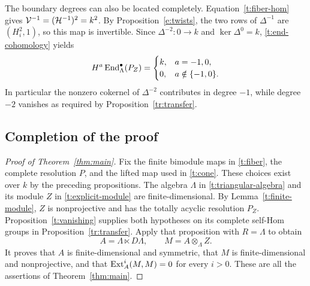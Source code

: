 \begin{remark}\label{t:neighboring-degrees}
The boundary degrees can also be located completely.
Equation~\eqref{t:fiber-hom} gives
$\mathcal V^{-1}=(\mathcal H^{-1})^2=k^2$.
By Proposition~\ref{e:twists}, the two rows of $\Delta^{-1}$ are
$(H_i^2,1)$, so this map is invertible.  Since $\Delta^{-2}:0\to k$
and $\ker\Delta^0=k$, \eqref{t:end-cohomology} yields
\[
 H^a\operatorname{End}_\Lambda^\bullet(P_Z)=
 \begin{cases}
 k,&a=-1,0,\\
 0,&a\notin\{-1,0\}.
 \end{cases}
\]
In particular the nonzero cokernel of $\Delta^{-2}$ contributes in
degree $-1$, while degree $-2$ vanishes as required by
Proposition~\ref{tr:transfer}.
\end{remark}

\subsection{Completion of the proof}

\begin{proof}[Proof of Theorem~\ref{thm:main}]
Fix the finite bimodule maps in \eqref{t:fiber}, the complete
resolution $P$, and the lifted map used in \eqref{t:cone}.
These choices exist over $k$ by the preceding propositions.
The algebra $\Lambda$ in \eqref{t:triangular-algebra} and its module
$Z$ in \eqref{t:explicit-module} are finite-dimensional.
By Lemma~\ref{t:finite-module}, $Z$ is nonprojective and has the
totally acyclic resolution $P_Z$.
Proposition~\ref{t:vanishing} supplies both hypotheses on its
complete self-Hom groups in Proposition~\ref{tr:transfer}.
Apply that proposition with $R=\Lambda$ to obtain
\[
 A=\Lambda\ltimes D\Lambda,
 \qquad M=A\otimes_\Lambda Z.
\]
It proves that $A$ is finite-dimensional and symmetric, that $M$
is finite-dimensional and nonprojective, and that
$\operatorname{Ext}_A^i(M,M)=0$ for every $i>0$.  These are all the assertions of
Theorem~\ref{thm:main}.
\end{proof}
